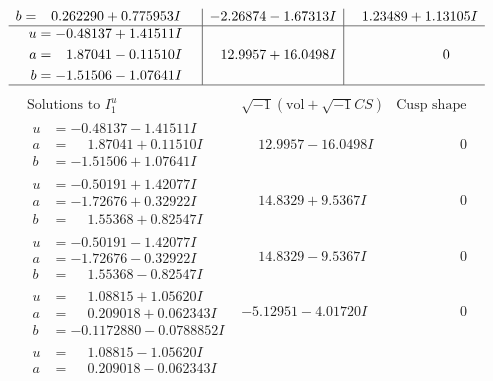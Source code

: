 \documentclass[1p]{elsarticle_modified}
\theoremstyle{definition}
\newcommand{\I}{\sqrt{-1}}
\begin{document}
$$\begin{array}{c|c|c}
\begin{aligned}
b &= \phantom{-}0.262290 + 0.775953 I\end{aligned}
 & -2.26874 - 1.67313 I & \phantom{-}1.23489 + 1.13105 I \\ \hline\begin{aligned}
u &= -0.48137 + 1.41511 I \\
a &= \phantom{-}1.87041 - 0.11510 I \\
b &= -1.51506 - 1.07641 I\end{aligned}
 & \phantom{-}12.9957 + 16.0498 I & \phantom{-0.000000 } 0\\
 \hline 
 \end{array}$$\newpage$$\begin{array}{c|c|c}  
\text{Solutions to }I^u_{1}& \I (\text{vol} + \sqrt{-1}CS) & \text{Cusp shape}\\
 \hline 
\begin{aligned}
u &= -0.48137 - 1.41511 I \\
a &= \phantom{-}1.87041 + 0.11510 I \\
b &= -1.51506 + 1.07641 I\end{aligned}
 & \phantom{-}12.9957 - 16.0498 I & \phantom{-0.000000 } 0 \\ \hline\begin{aligned}
u &= -0.50191 + 1.42077 I \\
a &= -1.72676 + 0.32922 I \\
b &= \phantom{-}1.55368 + 0.82547 I\end{aligned}
 & \phantom{-}14.8329 + 9.5367 I & \phantom{-0.000000 } 0 \\ \hline\begin{aligned}
u &= -0.50191 - 1.42077 I \\
a &= -1.72676 - 0.32922 I \\
b &= \phantom{-}1.55368 - 0.82547 I\end{aligned}
 & \phantom{-}14.8329 - 9.5367 I & \phantom{-0.000000 } 0 \\ \hline\begin{aligned}
u &= \phantom{-}1.08815 + 1.05620 I \\
a &= \phantom{-}0.209018 + 0.062343 I \\
b &= -0.1172880 - 0.0788852 I\end{aligned}
 & -5.12951 - 4.01720 I & \phantom{-0.000000 } 0 \\ \hline\begin{aligned}
u &= \phantom{-}1.08815 - 1.05620 I \\
a &= \phantom{-}0.209018 - 0.062343 I \\

\end{aligned}
\end{array}$$
\end{document}

